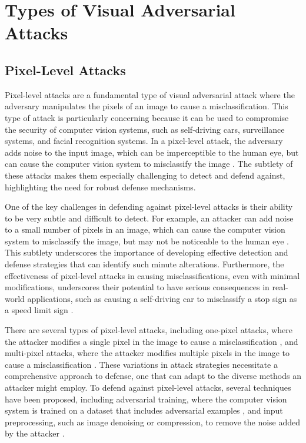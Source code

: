 \documentclass[11pt]{article}
\begin{document}
\section{Types of Visual Adversarial Attacks}

\subsection{Pixel-Level Attacks}

Pixel-level attacks are a fundamental type of visual adversarial attack where the adversary manipulates the pixels of an image to cause a misclassification. This type of attack is particularly concerning because it can be used to compromise the security of computer vision systems, such as self-driving cars, surveillance systems, and facial recognition systems. In a pixel-level attack, the adversary adds noise to the input image, which can be imperceptible to the human eye, but can cause the computer vision system to misclassify the image \cite{ref59}. The subtlety of these attacks makes them especially challenging to detect and defend against, highlighting the need for robust defense mechanisms.

One of the key challenges in defending against pixel-level attacks is their ability to be very subtle and difficult to detect. For example, an attacker can add noise to a small number of pixels in an image, which can cause the computer vision system to misclassify the image, but may not be noticeable to the human eye \cite{ref8}. This subtlety underscores the importance of developing effective detection and defense strategies that can identify such minute alterations. Furthermore, the effectiveness of pixel-level attacks in causing misclassifications, even with minimal modifications, underscores their potential to have serious consequences in real-world applications, such as causing a self-driving car to misclassify a stop sign as a speed limit sign \cite{ref60}.

There are several types of pixel-level attacks, including one-pixel attacks, where the attacker modifies a single pixel in the image to cause a misclassification \cite{ref61}, and multi-pixel attacks, where the attacker modifies multiple pixels in the image to cause a misclassification \cite{ref62}. These variations in attack strategies necessitate a comprehensive approach to defense, one that can adapt to the diverse methods an attacker might employ. To defend against pixel-level attacks, several techniques have been proposed, including adversarial training, where the computer vision system is trained on a dataset that includes adversarial examples \cite{ref63}, and input preprocessing, such as image denoising or compression, to remove the noise added by the attacker \cite{ref64}.
\end{document}
